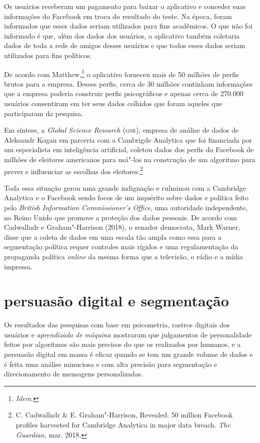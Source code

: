 Os usuários receberam um pagamento para baixar o aplicativo e conceder
suas informações do Facebook em troca do resultado do teste. Na época,
foram informados que esses dados seriam utilizados para fins acadêmicos.
O que não foi informado é que, além dos dados dos usuários, o aplicativo
também coletaria dados de toda a rede de amigos desses usuários e que
todos esses dados seriam utilizados para fins políticos.

De acordo com Matthew,\footnote{\textit{Idem}.} o aplicativo forneceu mais de 50
milhões de perfis brutos para a empresa. Desses perfis, cerca de 30
milhões continham informações que a empresa poderia construir perfis
psicográficos e apenas cerca de 270.000 usuários consentiram em ter seus
dados colhidos que foram aqueles que participaram da pesquisa.

Em síntese, a \textit{Global Science Research} (\textsc{gsr}), empresa de análise
de dados de Aleksandr Kogan em parceria com a Cambrigde Analytica que
foi financiada por um especialista em inteligência artificial, coletou
dados dos perfis do Facebook de milhões de eleitores americanos para
usá"-los na construção de um algoritmo para prever e influenciar as
escolhas dos eleitores.\footnote{C. Cadwalladr \& E. Graham"-Harrison, Revealed: 50 million
Facebook profiles harvested for Cambridge Analytica in major data
breach. \textit{The Guardian}, mar. 2018.}

Toda essa situação gerou uma grande indignação e culminou com a
Cambridge Analytica e o Facebook sendo focos de um inquérito sobre dados
e política feito pelo \textit{British Information Commissioner's Office},
uma autoridade independente, no Reino Unido que promove a proteção dos
dados pessoais. De acordo com Cadwalladr e Graham"-Harrison
(2018), o senador democrata, Mark Warner, disse que a coleta de dados em
uma escala tão ampla como essa para a segmentação política requer
controles mais rígidos e uma regulamentação da propaganda política
\textit{online} da mesma forma que a televisão, o rádio e a mídia impressa.

\section{persuasão digital e segmentação}

Os resultados das pesquisas com base em psicometria, rastros digitais
dos usuários e \textit{aprendizado de máquina} mostraram que julgamentos de
personalidade feitos por algoritmos são mais precisos do que os
realizados por humanos, e a persuasão digital em massa é eficaz quando se
tem um grande volume de dados e é feita uma análise minuciosa e com alta
precisão para segmentação e direcionamento de mensagens personalizadas.

